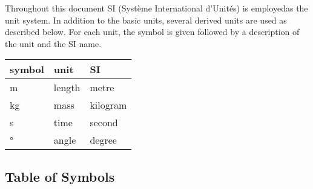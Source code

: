 \documentclass[12pt, titlepage]{article}
\begin{document}
Throughout this document SI (Syst\`{e}me International d'Unit\'{e}s) is
employedas the unit system. In addition to the basic units, several derived
units are
used as described below.  For each unit, the symbol is given followed by a
description of the unit and the SI name.\\

\renewcommand{\arraystretch}{1.2}
\begin{center}
  \noindent \begin{tabular}{l l l} 
    \toprule		
    \textbf{symbol} & \textbf{unit} & \textbf{SI}\\
    \midrule 
    \si{\metre} & length & metre\\
    \si{\kilogram} & mass & kilogram\\
    \si{\second} & time & second\\
    \si{\degree} & angle & degree\\
    \bottomrule
  \end{tabular}
\end{center}

\newpage

\subsection{Table of Symbols}
\end{document}
